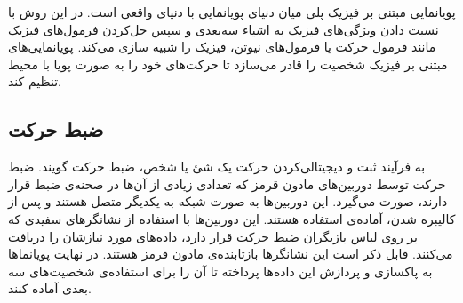 پویانمایی مبتنی بر فیزیک پلی میان دنیای پویانمایی با 
دنیای واقعی است. در این روش با نسبت دادن ویژگی‌های فیزیک به اشیاء سه‌بعدی و سپس حل‌کردن
فرمول‌های فیزیک مانند فرمول حرکت یا فرمول‌های نیوتن،
فیزیک را شبیه سازی می‌کند.
پویانمایی‌های مبتنی بر فیزیک شخصیت را قادر می‌سازد تا حرکت‌های خود را 
به صورت پویا با محیط تنظیم کند.

\subsection{ضبط حرکت
\protect {}}

به فرآیند ثبت و دیجیتالی‌کردن حرکت یک شئ یا شخص، ضبط حرکت گویند.
ضبط حرکت توسط دوربین‌های مادون قرمز که تعدادی زیادی از آن‌ها در صحنه‌ی ضبط قرار دارند، صورت می‌گیرد.
این دوربین‌ها به صورت شبکه به یکدیگر متصل هستند و پس از کالیبره شدن، آماده‌ی استفاده هستند.
این دوربین‌ها با استفاده از نشانگر‌های سفیدی که بر روی لباس بازیگران 
ضبط حرکت قرار دارد، داده‌های مورد نیازشان را دریافت می‌کنند.
قابل ذکر است این نشانگر‌ها بازتابنده‌ی مادون قرمز هستند.
در نهایت پویانماها به پاکسازی و پردازش این داده‌ها پرداخته تا آن را 
برای استفاده‌ی شخصیت‌های سه بعدی آماده کنند.



